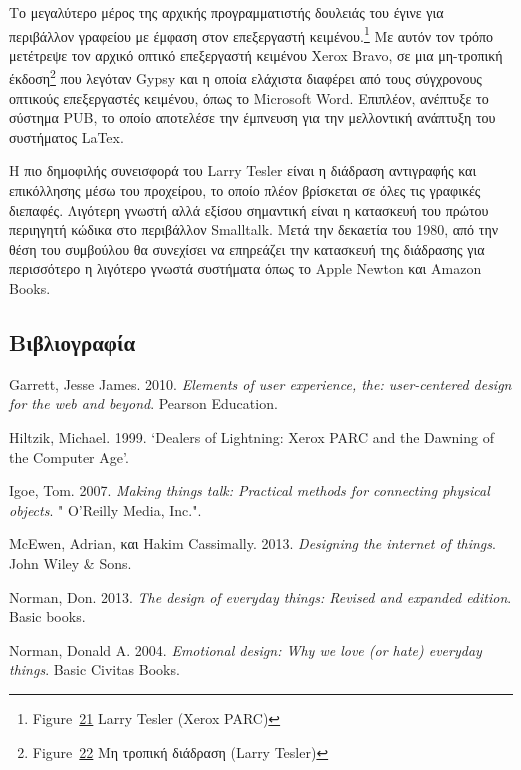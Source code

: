 \documentclass[
]{article}
\newlength{\cslhangindent}
\newlength{\cslentryspacingunit} %
\newenvironment{CSLReferences}[2] %
 {%
  \setlength{\parindent}{0pt}
  \ifodd #1
  \let\oldpar\par
  \def\par{\hangindent=\cslhangindent\oldpar}
  \fi
  \setlength{\parskip}{#2\cslentryspacingunit}
 }%
 {}
\begin{document}
Το μεγαλύτερο μέρος της αρχικής προγραμματιστής δουλειάς του έγινε για
περιβάλλον γραφείου με έμφαση στον επεξεργαστή κειμένου.\footnote{Figure~\protect\hyperlink{fig:tesler-profile}{21}
  Larry Tesler (Xerox PARC)} Με αυτόν τον τρόπο μετέτρεψε τον αρχικό
οπτικό επεξεργαστή κειμένου Xerox Bravo, σε μια μη-τροπική
έκδοση\footnote{Figure~\protect\hyperlink{fig:nomodes}{22} Μη τροπική
  διάδραση (Larry Tesler)} που λεγόταν Gypsy και η οποία ελάχιστα
διαφέρει από τους σύγχρονους οπτικούς επεξεργαστές κειμένου, όπως το
Microsoft Word. Επιπλέον, ανέπτυξε το σύστημα PUΒ, το οποίο αποτελέσε
την έμπνευση για την μελλοντική ανάπτυξη του συστήματος LaTex.

Η πιο δημοφιλής συνεισφορά του Larry Tesler είναι η διάδραση αντιγραφής
και επικόλλησης μέσω του προχείρου, το οποίο πλέον βρίσκεται σε όλες τις
γραφικές διεπαφές. Λιγότερη γνωστή αλλά εξίσου σημαντική είναι η
κατασκευή του πρώτου περιηγητή κώδικα στο περιβάλλον Smalltalk. Μετά την
δεκαετία του 1980, από την θέση του συμβούλου θα συνεχίσει να επηρεάζει
την κατασκευή της διάδρασης για περισσότερο η λιγότερο γνωστά συστήματα
όπως το Apple Newton και Amazon Books.

\hypertarget{ux3b2ux3b9ux3b2ux3bbux3b9ux3bfux3b3ux3c1ux3b1ux3c6ux3afux3b1}{%
\subsection*{Βιβλιογραφία}\label{ux3b2ux3b9ux3b2ux3bbux3b9ux3bfux3b3ux3c1ux3b1ux3c6ux3afux3b1}}

\hypertarget{refs}{}
\begin{CSLReferences}{0}{0}
\end{CSLReferences}

Garrett, Jesse James. 2010. \emph{Elements of user experience, the:
user-centered design for the web and beyond}. Pearson Education.

Hiltzik, Michael. 1999. {`Dealers of Lightning: Xerox PARC and the
Dawning of the Computer Age'}.

Igoe, Tom. 2007. \emph{Making things talk: Practical methods for
connecting physical objects}. " O'Reilly Media, Inc.".

McEwen, Adrian, και Hakim Cassimally. 2013. \emph{Designing the internet
of things}. John Wiley \& Sons.

Norman, Don. 2013. \emph{The design of everyday things: Revised and
expanded edition}. Basic books.

Norman, Donald A. 2004. \emph{Emotional design: Why we love (or hate)
everyday things}. Basic Civitas Books.
\end{document}
